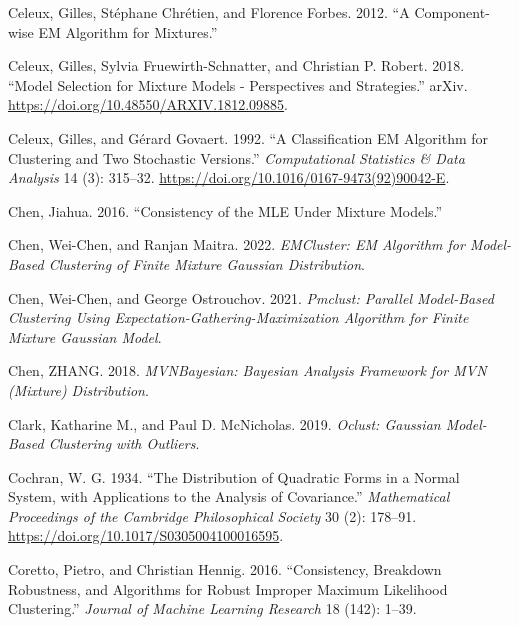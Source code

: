 \begin{CSLReferences}{1}{0}
\leavevmode{}%
Celeux, Gilles, Stéphane Chrétien, and Florence Forbes. 2012. {``A {Component-wise EM Algorithm} for {Mixtures}.''}

\leavevmode{}%
Celeux, Gilles, Sylvia Fruewirth-Schnatter, and Christian P. Robert. 2018. {``Model Selection for Mixture Models - Perspectives and Strategies.''} arXiv. \url{https://doi.org/10.48550/ARXIV.1812.09885}.

\leavevmode{}%
Celeux, Gilles, and Gérard Govaert. 1992. {``A Classification {EM} Algorithm for Clustering and Two Stochastic Versions.''} \emph{Computational Statistics \& Data Analysis} 14 (3): 315--32. \url{https://doi.org/10.1016/0167-9473(92)90042-E}.

\leavevmode{}%
Chen, Jiahua. 2016. {``Consistency of the {MLE} Under Mixture Models.''}

\leavevmode{}%
Chen, Wei-Chen, and Ranjan Maitra. 2022. \emph{EMCluster: EM Algorithm for Model-Based Clustering of Finite Mixture Gaussian Distribution}.

\leavevmode{}%
Chen, Wei-Chen, and George Ostrouchov. 2021. \emph{Pmclust: Parallel Model-Based Clustering Using Expectation-Gathering-Maximization Algorithm for Finite Mixture Gaussian Model}.

\leavevmode{}%
Chen, ZHANG. 2018. \emph{MVNBayesian: Bayesian Analysis Framework for MVN (Mixture) Distribution}.

\leavevmode{}%
Clark, Katharine M., and Paul D. McNicholas. 2019. \emph{Oclust: Gaussian Model-Based Clustering with Outliers}.

\leavevmode{}%
Cochran, W. G. 1934. {``The Distribution of Quadratic Forms in a Normal System, with Applications to the Analysis of Covariance.''} \emph{Mathematical Proceedings of the Cambridge Philosophical Society} 30 (2): 178--91. \url{https://doi.org/10.1017/S0305004100016595}.

\leavevmode{}%
Coretto, Pietro, and Christian Hennig. 2016. {``Consistency, Breakdown Robustness, and Algorithms for Robust Improper Maximum Likelihood Clustering.''} \emph{Journal of Machine Learning Research} 18 (142): 1--39.


\end{CSLReferences}
